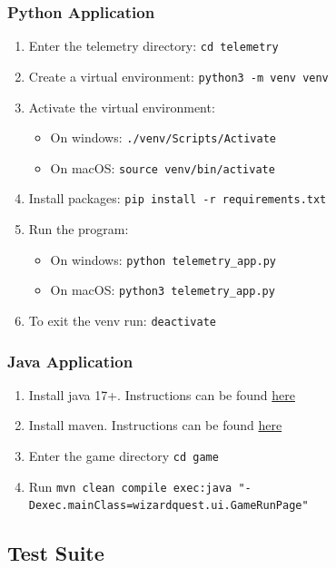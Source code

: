 \documentclass[11pt]{article}
\begin{document}
\subsubsection{Python Application}
\label{sec:python_src_deployment}
\begin{enumerate}
    \item Enter the telemetry directory: \verb|cd telemetry|
    \item Create a virtual environment: \verb|python3 -m venv venv|
  \item Activate the virtual environment:
    \begin{itemize}
        \item On windows: \verb|./venv/Scripts/Activate|
        \item On macOS: \verb|source venv/bin/activate|
    \end{itemize}
    \item Install packages: \verb|pip install -r requirements.txt|
  \item Run the program:
    \begin{itemize}
        \item On windows: \verb|python telemetry_app.py|
        \item On macOS: \verb|python3 telemetry_app.py|
    \end{itemize}
    \item To exit the venv run: \verb|deactivate|
\end{enumerate}

\subsubsection{Java Application}
\label{sec:java_src_deployment}
\begin{enumerate}
  \item Install java 17+. Instructions can be found \href{https://www.java.com/en/download/manual.jsp}{here}
  \item Install maven. Instructions can be found \href{https://maven.apache.org/install.html}{here}
    \item Enter the game directory \verb|cd game|
    \item Run \verb|mvn clean compile exec:java "-Dexec.mainClass=wizardquest.ui.GameRunPage"|
\end{enumerate}

\subsection{Test Suite}
\end{document}
